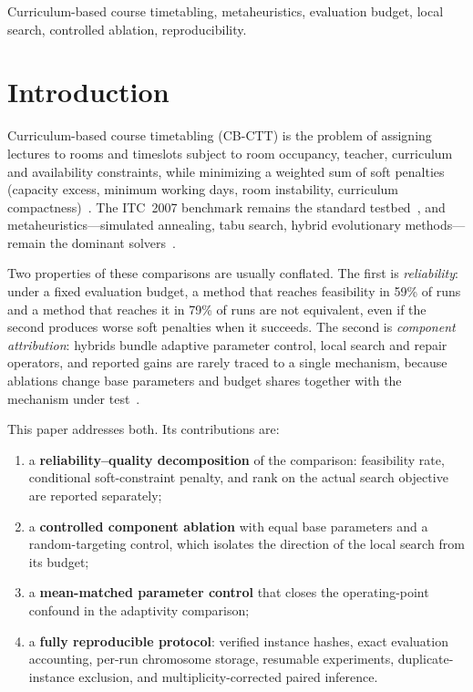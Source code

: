 \documentclass[journal]{IEEEtran}
\begin{document}
\begin{IEEEkeywords}
Curriculum-based course timetabling, metaheuristics, evaluation budget, local search, controlled ablation, reproducibility.
\end{IEEEkeywords}

\section{Introduction}
Curriculum-based course timetabling (CB-CTT) is the problem of assigning lectures to rooms and timeslots subject to room occupancy, teacher, curriculum and availability constraints, while minimizing a weighted sum of soft penalties (capacity excess, minimum working days, room instability, curriculum compactness)~\cite{mccollum2009setting}. The ITC~2007 benchmark remains the standard testbed~\cite{bonutti2012benchmarking,ceschia2022educational}, and metaheuristics---simulated annealing, tabu search, hybrid evolutionary methods---remain the dominant solvers~\cite{bettinelli2015survey,sylejmani2022simulated,rezaeipanah2021hybrid}.

Two properties of these comparisons are usually conflated. The first is \emph{reliability}: under a fixed evaluation budget, a method that reaches feasibility in 59\% of runs and a method that reaches it in 79\% of runs are not equivalent, even if the second produces worse soft penalties when it succeeds. The second is \emph{component attribution}: hybrids bundle adaptive parameter control, local search and repair operators, and reported gains are rarely traced to a single mechanism, because ablations change base parameters and budget shares together with the mechanism under test~\cite{eiben1999parameter}.

This paper addresses both. Its contributions are:
\begin{enumerate}
    \item a \textbf{reliability--quality decomposition} of the comparison: feasibility rate, conditional soft-constraint penalty, and rank on the actual search objective are reported separately;
    \item a \textbf{controlled component ablation} with equal base parameters and a random-targeting control, which isolates the direction of the local search from its budget;
    \item a \textbf{mean-matched parameter control} that closes the operating-point confound in the adaptivity comparison;
    \item a \textbf{fully reproducible protocol}: verified instance hashes, exact evaluation accounting, per-run chromosome storage, resumable experiments, duplicate-instance exclusion, and multiplicity-corrected paired inference.
\end{enumerate}
\end{document}

